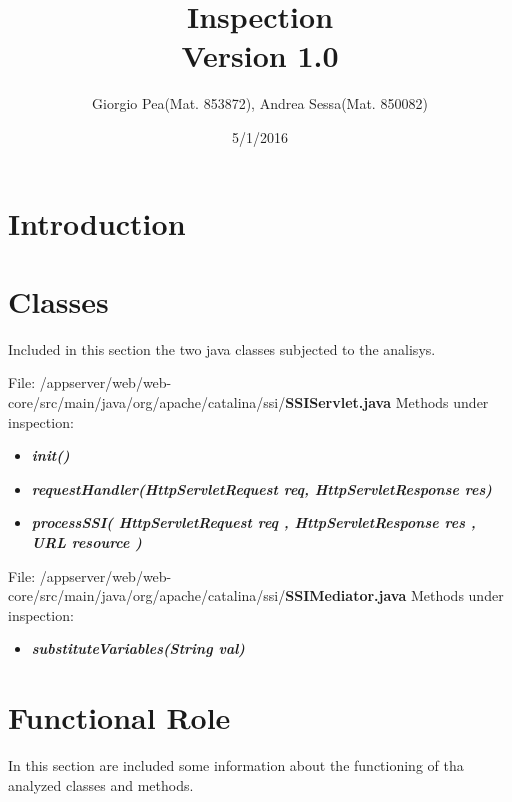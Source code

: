 \documentclass[11pt,titlepage]{article} %
\title{Inspection \\ \vspace{1cm} \large{Version 1.0}}
\author{Giorgio Pea(Mat. 853872), Andrea Sessa(Mat. 850082)}
\date{5/1/2016}
\begin{document}
\maketitle

\newpage

\tableofcontents

\newpage

\section{Introduction}

\section{Classes}

Included in this section the two java classes subjected to the analisys.\newline

\noindent File: /appserver/web/web-core/src/main/java/org/apache/catalina/ssi/\textbf{SSIServlet.java}\newline\newline
Methods under inspection:
  \begin{itemize}
    \item \textbf{\textit{init()}}
    \item \textbf{\textit{requestHandler(HttpServletRequest req, HttpServletResponse res)}}
    \item \textbf{\textit{processSSI( HttpServletRequest req , HttpServletResponse res , URL resource )}}
  \end{itemize}

\noindent File: /appserver/web/web-core/src/main/java/org/apache/catalina/ssi/\textbf{SSIMediator.java}\newline\newline
Methods under inspection:
  \begin{itemize}
    \item \textbf{\textit{substituteVariables(String val)}}
  \end{itemize}
  
\newpage


\section{Functional Role}
  In this section are included some information about the functioning of tha analyzed classes and methods.\newline
\end{document}
